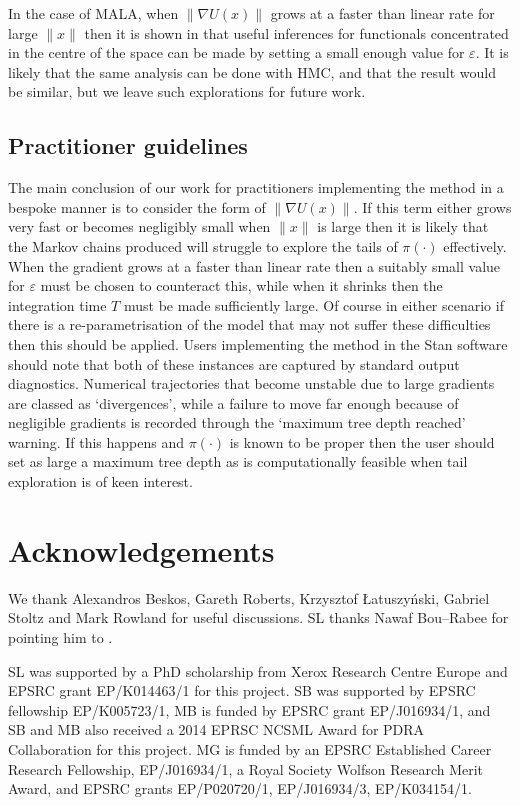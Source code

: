 \documentclass[bj,numbers,noshowframe]{imsart}
\newcommand{\e}{\varepsilon}
\theoremstyle{definition}
\theoremstyle{plain}
\theoremstyle{definition}
\begin{document}
In the case of MALA, when $\|\nabla U(x)\|$ grows at a faster than linear rate for large $\|x\|$ then it is shown in \citep{bou2012nonasymptotic} that useful inferences for functionals concentrated in the centre of the space can be made by setting a small enough value for $\e$.  It is likely that the same analysis can be done with HMC, and that the result would be similar, but we leave such explorations for future work.

\subsection{Practitioner guidelines}

The main conclusion of our work for practitioners implementing the method in a bespoke manner is to consider the form of $\|\nabla U(x)\|$.  If this term either grows very fast or becomes negligibly small when $\|x\|$ is large then it is likely that the Markov chains produced will struggle to explore the tails of $\pi(\cdot)$ effectively.  When the gradient grows at a faster than linear rate then a suitably small value for $\e$ must be chosen to counteract this, while when it shrinks then the integration time $T$ must be made sufficiently large.  Of course in either scenario if there is a re-parametrisation of the model that may not suffer these difficulties then this should be applied.  Users implementing the method in the Stan software \citep{carpenter2016stan} should note that both of these instances are captured by standard output diagnostics.  Numerical trajectories that become unstable due to large gradients are classed as `divergences', while a failure to move far enough because of negligible gradients is recorded through the `maximum tree depth reached' warning.  If this happens and $\pi(\cdot)$ is known to be proper then the user should set as large a maximum tree depth as is computationally feasible when tail exploration is of keen interest.

\section*{Acknowledgements}

We thank Alexandros Beskos, Gareth Roberts, Krzysztof \L{}atuszy\'{n}ski, Gabriel Stoltz and Mark Rowland for useful discussions.  SL thanks Nawaf Bou--Rabee for pointing him to \citep{cances2007theoretical}.

SL was supported by a PhD scholarship from Xerox Research Centre Europe and EPSRC grant EP/K014463/1 for this project.  SB was supported by EPSRC fellowship EP/K005723/1, MB is funded by EPSRC grant EP/J016934/1, and SB and MB also received a 2014 EPRSC NCSML Award for PDRA Collaboration for this project.  MG is funded by an EPSRC Established Career Research Fellowship, EP/J016934/1, a Royal Society Wolfson Research Merit Award, and EPSRC grants EP/P020720/1, EP/J016934/3, EP/K034154/1.
\end{document}
